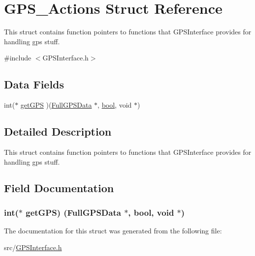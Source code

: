 \hypertarget{struct_g_p_s___actions}{}\section{G\+P\+S\+\_\+\+Actions Struct Reference}
\label{struct_g_p_s___actions}


This struct contains function pointers to functions that G\+P\+S\+Interface provides for handling gps stuff.  




{\ttfamily \#include $<$G\+P\+S\+Interface.\+h$>$}

\subsection*{Data Fields}
\begin{DoxyCompactItemize}
\item 
int($\ast$ \hyperlink{struct_g_p_s___actions_a5dd8131dc7f60bbfd44b89c1d29090b9}{get\+G\+PS} )(\hyperlink{struct_full_g_p_s_data}{Full\+G\+P\+S\+Data} $\ast$, \hyperlink{types_8h_af6a258d8f3ee5206d682d799316314b1}{bool}, void $\ast$)
\end{DoxyCompactItemize}


\subsection{Detailed Description}
This struct contains function pointers to functions that G\+P\+S\+Interface provides for handling gps stuff. 

\subsection{Field Documentation}
\subsubsection[{\texorpdfstring{get\+G\+PS}{getGPS}}]{\setlength{\rightskip}{0pt plus 5cm}int($\ast$ get\+G\+PS) ({\bf Full\+G\+P\+S\+Data} $\ast$, {\bf bool}, void $\ast$)}\hypertarget{struct_g_p_s___actions_a5dd8131dc7f60bbfd44b89c1d29090b9}{}\label{struct_g_p_s___actions_a5dd8131dc7f60bbfd44b89c1d29090b9}


The documentation for this struct was generated from the following file\+:\begin{DoxyCompactItemize}
\item 
src/\hyperlink{_g_p_s_interface_8h}{G\+P\+S\+Interface.\+h}\end{DoxyCompactItemize}
